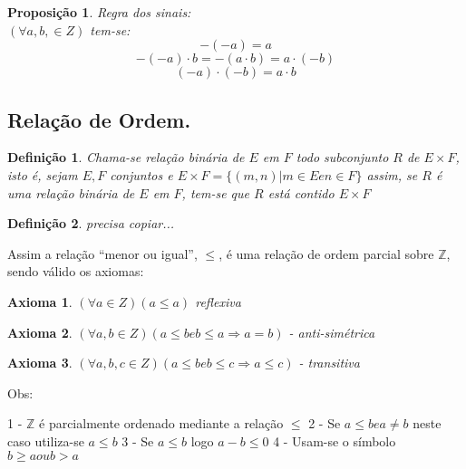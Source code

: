 \documentclass[a4paper,12pt]{article}
\newtheorem{prop_int}{Proposição}
\newtheorem{definit}{Definição}
\newtheorem{ax}{Axioma}
\begin{document}
\begin{prop_int} %
  Regra dos sinais:\\
  $(\forall a, b, \in Z)$ tem-se:\\
  \begin{equation} %
    -(-a) = a
  \end{equation}
  \begin{equation} %
    -(-a) \cdot b = -(a \cdot b) = a \cdot (-b)
  \end{equation}
  \begin{equation} %
    (-a) \cdot (-b) = a \cdot b
  \end{equation}
\end{prop_int}

\subsection{Relação de Ordem.}

\begin{definit}
 Chama-se relação binária de $E$ em $F$  todo subconjunto $R$ de $E \times F$, isto é, sejam $E, F$ conjuntos e $E \times F = \{(m, n) | m \in E e n \in F\}$ assim, se $R$ é uma relação binária de $E$ em $F$, tem-se que $R$ está contido  $ E \times F$ %
\end{definit}

\begin{definit}
 precisa copiar...
\end{definit}

Assim a relação ``menor ou igual'', $\leq$, é uma relação de ordem parcial sobre $\mathbb{Z}$, sendo válido os axiomas:

\begin{ax}
  $(\forall  a \in Z)(a \leq a)$ reflexiva
\end{ax}
\begin{ax}
  $(\forall a, b \in Z)(a \leq b e b \leq a \Longrightarrow a = b)$ - anti-simétrica
\end{ax}
\begin{ax}
  $(\forall a, b, c \in Z)(a \leq b e b \leq c \Longrightarrow a \leq c)$ - transitiva
\end{ax}

Obs:

1 - $\mathbb{Z}$ é parcialmente ordenado mediante a relação $\leq$
2 - Se $a \leq b e a \neq b$ neste caso utiliza-se $a \leq b$
3 - Se $a \leq b$ logo $a - b \leq 0$
4 - Usam-se o símbolo $b \geq a ou b > a$
\end{document}
